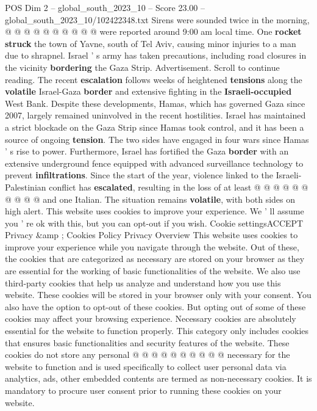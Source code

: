 \begin{textsample}{POS Dim 2 – global\_south\_2023\_10 – Score 23.00 – global\_south\_2023\_10/102422348.txt}
Sirens were sounded twice in the morning, @ @ @ @ @ @ @ @ @ @ were reported around 9:00 am local time.
One \textbf{rocket} \textbf{struck} the town of Yavne, south of Tel Aviv, causing minor injuries to a man due to shrapnel.
Israel ' s army has taken precautions, including road closures in the vicinity \textbf{bordering} the Gaza Strip.
Advertisement.
Scroll to continue reading.
The recent \textbf{escalation} follows weeks of heightened \textbf{tensions} along the \textbf{volatile} Israel-Gaza \textbf{border} and extensive fighting in the \textbf{Israeli-occupied} West Bank.
Despite these developments, Hamas, which has governed Gaza since 2007, largely remained uninvolved in the recent hostilities.
Israel has maintained a strict blockade on the Gaza Strip since Hamas took control, and it has been a source of ongoing \textbf{tension}.
The two sides have engaged in four wars since Hamas ' s rise to power.
Furthermore, Israel has fortified the Gaza \textbf{border} with an extensive underground fence equipped with advanced surveillance technology to prevent \textbf{infiltrations}.
Since the start of the year, violence linked to the Israeli-Palestinian conflict has \textbf{escalated}, resulting in the loss of at least @ @ @ @ @ @ @ @ @ @ and one Italian.
The situation remains \textbf{volatile}, with both sides on high alert.
This website uses cookies to improve your experience.
We ' ll assume you ' re ok with this, but you can opt-out if you wish.
Cookie settingsACCEPT Privacy \&amp ; Cookies Policy Privacy Overview This website uses cookies to improve your experience while you navigate through the website.
Out of these, the cookies that are categorized as necessary are stored on your browser as they are essential for the working of basic functionalities of the website.
We also use third-party cookies that help us analyze and understand how you use this website.
These cookies will be stored in your browser only with your consent.
You also have the option to opt-out of these cookies.
But opting out of some of these cookies may affect your browsing experience.
Necessary cookies are absolutely essential for the website to function properly.
This category only includes cookies that ensures basic functionalities and security features of the website.
These cookies do not store any personal @ @ @ @ @ @ @ @ @ @ necessary for the website to function and is used specifically to collect user personal data via analytics, ads, other embedded contents are termed as non-necessary cookies.
It is mandatory to procure user consent prior to running these cookies on your website.

\end{textsample}
